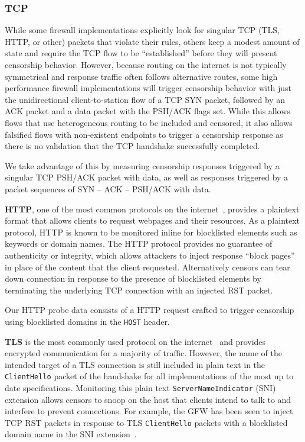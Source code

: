 
\FigProbeSend

\subsubsection{TCP}
While some firewall implementations explicitly look for singular TCP (TLS, HTTP,
or other) packets that violate their rules, others keep a modest amount of state
and require the TCP flow to be ``established'' before they will present
censorship behavior. However, because routing on the internet is not typically
symmetrical and response traffic often follows alternative routes, some high
performance firewall implementations will trigger censorship behavior with just
the unidirectional client-to-station flow of a TCP SYN packet, followed by an
ACK packet and a data packet with the PSH/ACK flags set. While this allows flows
that use heterogeneous routing to be included and censored, it also allows
falsified flows with non-existent endpoints to trigger a censorship response as
there is no validation that the TCP handshake successfully completed.

We take advantage of this by measuring censorship responses triggered by a
singular TCP PSH/ACK packet with data, as well as responses triggered by a
packet sequences of SYN -- ACK -- PSH/ACK with data.


\textbf{HTTP}, one of the most common protocols on the internet~\cite{},
provides a plaintext format that allows clients to request webpages and their
resources. As a plaintext protocol, HTTP is known to be monitored inline for
blocklisted elements such as keywords or domain names. The HTTP protocol
provides no guarantee of authenticity or integrity, which allows attackers to
inject response ``block pages'' in place of the content that the client
requested. Alternatively censors can tear down connection in response to the
presence of blocklisted elements by terminating the underlying TCP connection
with an injected RST packet.

Our HTTP probe data consists of a HTTP request crafted to trigger censorship
using blocklisted domains in the \texttt{HOST} header.

\textbf{TLS} is the most commonly used protocol on the internet~\cite{} and
provides encrypted communication for a majority of traffic. However, the name of
the intended target of a TLS connection is still included in plain text in the
{\tt ClientHello} packet of the handshake for all implementations of the most up
to date specifications. Monitoring this plain text {\tt ServerNameIndicator}
(SNI) extension allows censors to snoop on the host that clients intend to talk
to and interfere to prevent connections. For example, the GFW has been seen to
inject TCP RST packets in response to TLS {\tt ClientHello} packets with a
blocklisted domain name in the SNI extension~\cite{}.

